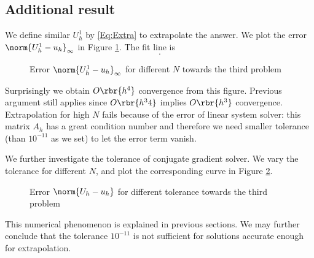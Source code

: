 \documentclass[english, nochinese]{pnote}
\newcommand\normi[1]{\norm{#1}_{\infty}}
\begin{document}
\subsection{Additional result}

We define similar $U_h^1$ by \eqref{Eq:Extra} to extrapolate the answer. We plot the error $ \normi{ U_h^1 - u_h } $ in Figure \ref{Fig:Prob3Extra}. The fit line is
\begin{equation}
.
\end{equation}

\begin{figure}[htbp]
\centering

\caption{Error $ \normi{ U_h^1 - u_h } $ for different $N$ towards the third problem}
\label{Fig:Prob3Extra}
\end{figure}

Surprisingly we obtain $ O \rbr{h^4} $ convergence from this figure. Previous argument still applies since $ O \rbr{h^34} $ implies $ O \rbr{h^3} $ convergence. Extrapolation for high $N$ fails because of the error of linear system solver: this matrix $A_h$ has a great condition number and therefore we need smaller tolerance (than $10^{-11}$ as we set) to let the error term vanish.

We further investigate the tolerance of conjugate gradient solver. We vary the tolerance for different $N$, and plot the corresponding curve in Figure \ref{Fig:Prob3Tol}.

\begin{figure}[htbp]
\centering

\caption{Error $ \norm{ U_h - u_h } $ for different tolerance towards the third problem}
\label{Fig:Prob3Tol}
\end{figure}

This numerical phenomenon is explained in previous sections. We may further conclude that the tolerance $10^{-11}$ is not sufficient for solutions accurate enough for extrapolation.
\end{document}

